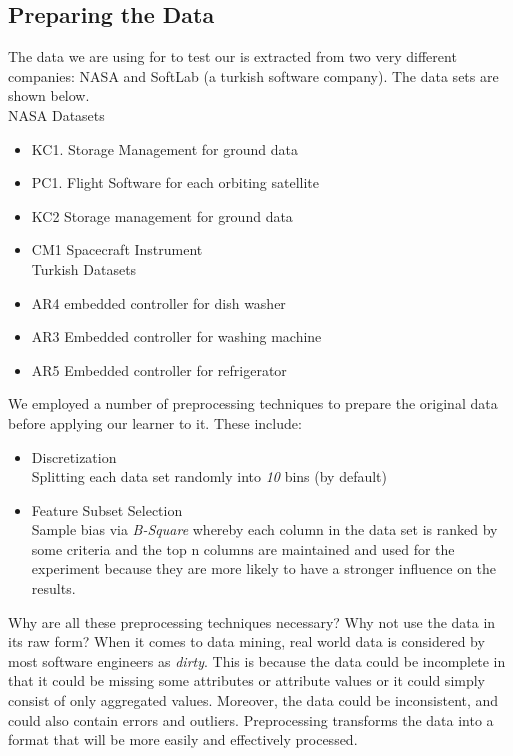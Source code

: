 \documentclass{sig-alternate}
\begin{document}
\subsection{Preparing the Data}
The data we are using for to test our is extracted from two very different companies: NASA and SoftLab (a turkish software company). The data sets are shown below.
\\NASA Datasets
\begin{itemize}
\item{ KC1. Storage Management for ground data }
\item{PC1. Flight Software for each orbiting satellite}
\item{KC2 Storage management for ground data}
\item{CM1} Spacecraft Instrument
\\Turkish Datasets
\item {AR4} embedded controller for dish washer
\item{AR3} Embedded controller for washing machine
\item{AR5} Embedded controller for refrigerator
\end{itemize}
We employed a number of preprocessing techniques to prepare the original data before applying our learner to it. These include:

\begin{itemize}
\item{Discretization}
\\Splitting each data set randomly into {\em 10} bins (by default)
\item{Feature Subset Selection}
\\Sample bias via {\em B-Square} whereby each column in the data set is ranked by some criteria and the top n columns are maintained and used for the experiment because they are more likely to have a stronger influence on the results.
\end{itemize}
Why are all these preprocessing techniques necessary? Why not use the data in its raw form? When it comes to data mining, real world data is considered by most software engineers as {\em dirty}. This is because the data could be incomplete in that it could be missing some attributes or attribute values or it could simply consist of only aggregated values. Moreover, the data could be inconsistent, and could also contain errors and outliers. Preprocessing transforms the data into a format that will be more easily and effectively processed.
\end{document}
